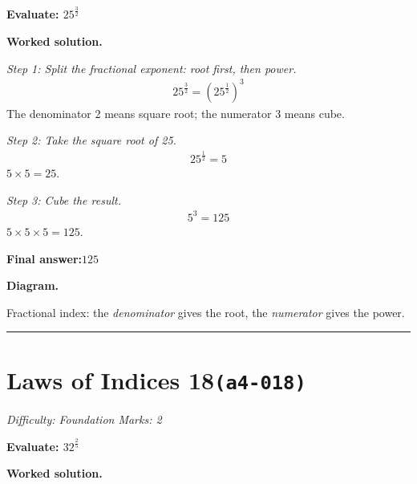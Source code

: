 \documentclass[11pt]{article}
\newcommand{\question}[1]{\par\medskip\noindent\textbf{#1}\par}
\begin{document}
\question{Evaluate: \( 25^{\frac{3}{2}} \)}

\textbf{Worked solution.}

\textit{Step 1: Split the fractional exponent: root first, then power.}
\[\begin{gathered}
25^{\frac{3}{2}} = \left(25^{\frac{1}{2}}\right)^3
\end{gathered}\]
The denominator 2 means square root; the numerator 3 means cube.

\textit{Step 2: Take the square root of 25.}
\[\begin{gathered}
25^{\frac{1}{2}} = 5
\end{gathered}\]
\( 5 \times 5 = 25 \).

\textit{Step 3: Cube the result.}
\[\begin{gathered}
5^3 = 125
\end{gathered}\]
\( 5 \times 5 \times 5 = 125 \).

\begin{answerbox}
\textbf{Final answer:}\quad \(\displaystyle 125\)
\end{answerbox}
\textbf{Diagram.}

\begin{center}
\end{center}
\small Fractional index: the \emph{denominator} gives the root, the \emph{numerator} gives the power.\normalsize

\medskip\hrule

\section*{Laws of Indices 18\quad\small\texttt{(a4-018)}}
\textit{Difficulty: Foundation \quad\textbar\quad Marks: 2}

\question{Evaluate: \( 32^{\frac{2}{5}} \)}

\textbf{Worked solution.}
\end{document}
